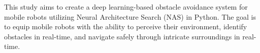 This study aims to create a deep learning-based obstacle avoidance system for mobile robots utilizing Neural Architecture Search (NAS) in Python. The goal is to equip mobile robots with the ability to perceive their environment, identify obstacles in real-time, and navigate safely through intricate surroundings in real-time.